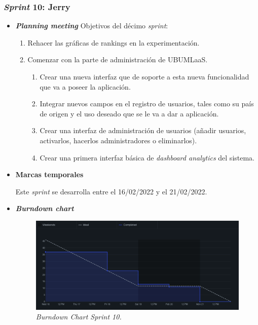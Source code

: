 \subsubsection{\textit{Sprint} 10: Jerry}
\begin{itemize}
\item \textbf{\textit{Planning meeting}}
Objetivos del décimo \textit{sprint}:
\begin{enumerate}
\item Rehacer las gráficas de rankings en la experimentación.
\item Comenzar con la parte de administración de UBUMLaaS.
\begin{enumerate}
\item Crear una nueva interfaz que de soporte a esta nueva funcionalidad que va a poseer la aplicación.
\item Integrar nuevos campos en el registro de usuarios, tales como su país de origen y el uso deseado que se le va a dar a aplicación.
\item Crear una interfaz de administración de usuarios (añadir usuarios, activarlos, hacerlos administradores o eliminarlos).
\item Crear una primera interfaz básica de \textit{dashboard analytics} del sistema.
\end{enumerate}
\end{enumerate}
\item \textbf{Marcas temporales}

Este \textit{sprint} se desarrolla entre el 16/02/2022 y el 21/02/2022.
\item \textbf{\textit{Burndown chart}}
\begin{figure}
\begin{center}
\includegraphics[width=\textwidth]{../img/anexos/sprints/BD-Sprint10}
\caption{\textit{Burndown Chart Sprint 10.}}\label{fig:BD-Sprint10}
\end{center}
\end{figure}


\end{itemize}
